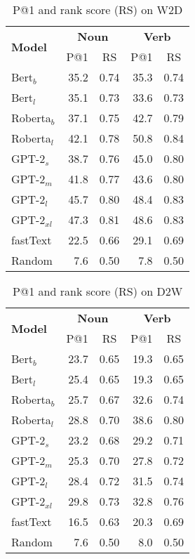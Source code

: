 \documentclass[11pt,a4paper]{article}
\begin{document}
\begin{table}
    \centering
    \begin{tabular}{l|rrrr}
        \hline
         \multirow{2}{*}{\textbf{Model}} & \multicolumn{2}{c}{\textbf{Noun}} & \multicolumn{2}{c}{\textbf{Verb}} \\
         & \multicolumn{1}{c}{P@1} & \multicolumn{1}{c}{RS} & \multicolumn{1}{c}{P@1} & \multicolumn{1}{c}{RS} \\ \hline
     Bert$_{b}$ & 35.2 & 0.74 & 35.3 & 0.74 \\
     Bert$_{l}$ & 35.1 & 0.73 & 33.6 & 0.73 \\
     Roberta$_{b}$ & 37.1 & 0.75 & 42.7 & 0.79 \\
     Roberta$_{l}$ & 42.1 & 0.78 & 50.8 & 0.84 \\ \hline
     GPT-2$_{s}$ & 38.7 & 0.76 & 45.0 & 0.80 \\
     GPT-2$_{m}$ & 41.8 & 0.77 & 43.6 & 0.80 \\
     GPT-2$_{l}$ & 45.7 & 0.80 & 48.4 & 0.83 \\
     GPT-2$_{xl}$ & 47.3 & 0.81 & 48.6 & 0.83 \\
     \hline 
     fastText & 22.5 & 0.66 & 29.1 & 0.69 \\ \hline 
     Random & 7.6 & 0.50 & 7.8 & 0.50 \\\hline
     
    \end{tabular}
    \caption{P@1 and rank score (RS) on W2D}
    \label{tab:results_W2D}
\end{table}


\begin{table}
    \centering
    \begin{tabular}{l|rrrr}
        \hline
         \multirow{2}{*}{\textbf{Model}} & \multicolumn{2}{c}{\textbf{Noun}} & \multicolumn{2}{c}{\textbf{Verb}} \\
         & \multicolumn{1}{c}{P@1} & \multicolumn{1}{c}{RS} & \multicolumn{1}{c}{P@1} & \multicolumn{1}{c}{RS} \\ \hline
     Bert$_{b}$ & 23.7 & 0.65 & 19.3 & 0.65 \\
     Bert$_{l}$ & 25.4 & 0.65 & 19.3 & 0.65 \\
     Roberta$_{b}$ & 25.7 & 0.67 & 32.6 & 0.74 \\
     Roberta$_{l}$ & 28.8 & 0.70 & 38.6 & 0.80 \\ \hline
     GPT-2$_{s}$ & 23.2 & 0.68 & 29.2 & 0.71 \\
     GPT-2$_{m}$ & 25.3 & 0.70 & 27.8 & 0.72 \\
     GPT-2$_{l}$ & 28.4 & 0.72 & 31.5 & 0.74 \\
     GPT-2$_{xl}$ & 29.8 & 0.73 & 32.8 & 0.76 \\ \hline 
     fastText & 16.5 & 0.63 & 20.3 & 0.69 \\ \hline 
     Random & 7.6 & 0.50 & 8.0 & 0.50 \\\hline
     
    \end{tabular}
    \caption{P@1 and rank score (RS) on D2W}
    \label{tab:results_D2W}
\end{table}
\end{document}
